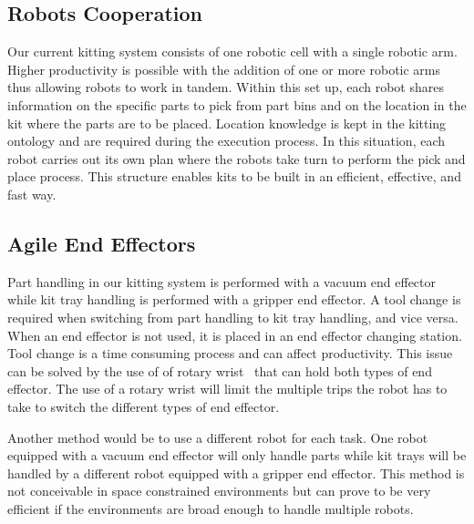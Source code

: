 \documentclass[final,3p,12pt]{elsarticle}
\begin{document}


\subsection{Robots Cooperation}
Our current kitting system consists of one robotic cell with a single robotic arm. Higher productivity is possible with the addition of one or more robotic arms thus allowing robots to work in tandem. Within this set up, each robot shares information on the specific parts to pick from part bins and on the location in the kit where the parts are to be placed. Location knowledge is kept in the kitting ontology and are required during the execution process. In this situation, each robot carries out its own plan where the robots take turn to perform the pick and place process. This structure enables kits to be built in an efficient, effective, and fast way.

\subsection{Agile End Effectors}
Part handling in our kitting system is performed with a vacuum end effector while kit tray handling is performed with a gripper end effector. A tool change is required when switching from part handling to kit tray handling, and vice versa. When an end effector is not used, it is placed in an end effector changing station. Tool change is a time consuming process and can affect productivity. This issue can be solved by the use of of rotary wrist~\cite{QUINN.1997} that can hold both types of end effector. The use of a rotary wrist will limit the multiple trips the robot has to take to switch the different types of end effector.

Another method would be to use a different robot for each task. One robot equipped with a vacuum end effector will only handle parts while kit trays will be handled by a different robot equipped with a gripper end effector. This method is not conceivable in space constrained environments but can prove to be very efficient if the environments are broad enough to handle multiple robots.
\end{document}
